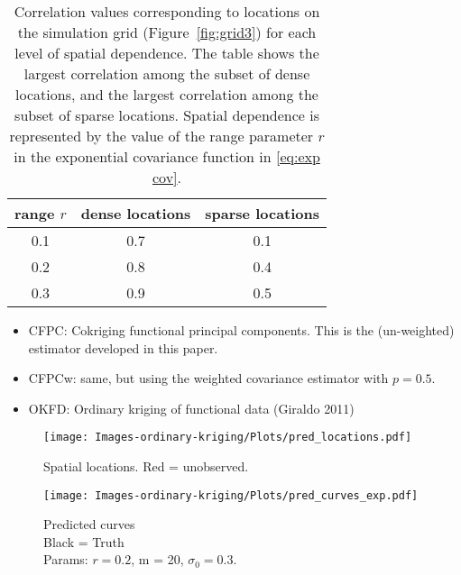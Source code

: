 \documentclass{beamer}
\begin{document}
\begin{frame}[t]{}
\begin{table}
	\begin{center}
	\caption{Correlation values corresponding to locations on the simulation grid (Figure~\ref{fig:grid3}) for each level of spatial dependence. The table shows the largest correlation among the subset of dense locations, and the largest correlation among the subset of sparse locations. Spatial dependence is represented by the value of the range parameter $r$ in the exponential covariance function in \eqref{eq:exp cov}.}
\begin{tabular}{|c|c|c|}
	\hline
	range $r$ & dense locations & sparse locations \\
	\hline
	0.1 & 0.7 & 0.1 \\
	0.2 & 0.8 & 0.4 \\
	0.3 & 0.9 & 0.5 \\
	\hline
\end{tabular}
\label{tab:corr values}
\end{center}
\end{table}
\end{frame}

\begin{frame}[t]{}
	\begin{itemize}
		\item CFPC: Cokriging functional principal components. This is the (un-weighted) estimator developed in this paper.
		\item CFPCw: same, but using the weighted covariance estimator with $p=0.5$.
		\item OKFD: Ordinary kriging of functional data (Giraldo 2011)
	\end{itemize}
\end{frame}

\begin{frame}[t]{}
	\begin{minipage}{0.4\textwidth}
		\begin{figure}
			\begin{center}
				\texttt{[image: Images-ordinary-kriging/Plots/pred\_locations.pdf]} 
			\end{center}
			\caption{Spatial locations. Red = unobserved.} 
		\end{figure}
	\end{minipage}
	\begin{minipage}{0.5\textwidth}
		\begin{figure}
			\begin{center}
				\texttt{[image: Images-ordinary-kriging/Plots/pred\_curves\_exp.pdf]} 
			\end{center}
			\caption{Predicted curves\\ Black = Truth\\ Params: $r = 0.2$, m = 20, $\sigma_0 = 0.3$.  } 
		\end{figure}
	\end{minipage}
\end{frame}
\end{document}
